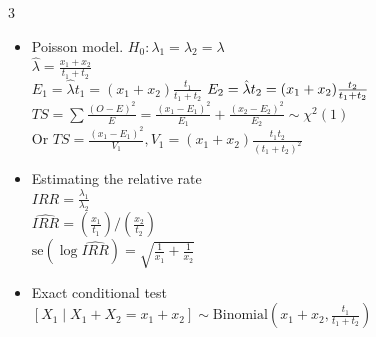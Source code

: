 \documentclass[a4paper,10pt]{article}
\begin{document}
\begin{multicols}{3}
\begin{itemize}
    \item Poisson model. $H_0:\lambda_1=\lambda_2=\lambda$\\
    $\hat{\lambda} = \frac{x_1 + x_2}{t_1 + t_2}$\\      
    $
    E_1 = \hat{\lambda} t_1 = (x_1 + x_2) \frac{t_1}{t_1 + t_2}$
    $\\
    E_2 = \hat{\lambda} t_2 = (x_1 + x_2) \frac{t_2}{t_1 + t_2}
    $\\
    $TS = \sum \frac{(O - E)^2}{E} = \frac{(x_1 - E_1)^2}{E_1} + \frac{(x_2 - E_2)^2}{E_2}\sim \chi^2(1)$\\
    Or $TS = \frac{(x_1 - E_1)^2}{V_1}, V_1 = (x_1 + x_2) \frac{t_1 t_2}{(t_1 + t_2)^2}$
    \item Estimating the relative rate\\
    $IRR=\frac{\lambda_1}{\lambda_2}$\\
    $\hat{IRR} = \left( \frac{x_1}{t_1} \right) / \left( \frac{x_2}{t_2} \right)$\\
    $\mathrm{se}(\log \hat{IRR}) = \sqrt{\frac{1}{x_1} + \frac{1}{x_2}}$
    \item Exact conditional test
    $[X_1 \mid X_1 + X_2 = x_1 + x_2] \sim \text{Binomial} \left( x_1 + x_2, \frac{t_1}{t_1 + t_2} \right)$

\end{itemize}


\end{multicols}
\end{document}

